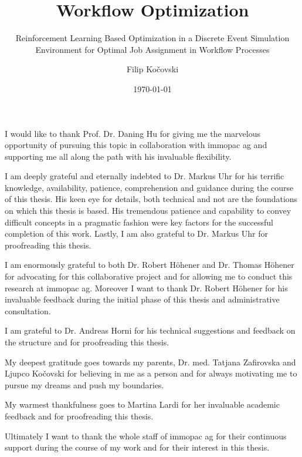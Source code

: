 \documentclass{seal_thesis}
\date{\today}
\title{Workflow Optimization}
\subtitle{Reinforcement Learning Based Optimization in a Discrete Event Simulation Environment for Optimal Job Assignment in Workflow Processes}
\author{Filip Ko\v{c}ovski}
\begin{document}
\maketitle

\frontmatter

\begin{acknowledgements}

I would like to thank Prof. Dr. Daning Hu for giving me the marvelous opportunity of pursuing this topic in collaboration with immopac ag and supporting me all along the path with his invaluable flexibility.

I am deeply grateful and eternally indebted to Dr. Markus Uhr for his terrific knowledge, availability, patience, comprehension and guidance during the course of this thesis. His keen eye for details, both technical and not are the foundations on which this thesis is based. His tremendous patience and capability to convey difficult concepts in a pragmatic fashion were key factors for the successful completion of this work. Lastly, I am also grateful to Dr. Markus Uhr for proofreading this thesis.

I am enormously grateful to both Dr. Robert H\"ohener and Dr. Thomas H\"ohener for advocating for this collaborative project and for allowing me to conduct this research at immopac ag. Moreover I want to thank Dr. Robert H\"ohener for his invaluable feedback during the initial phase of this thesis and administrative consultation.

I am grateful to Dr. Andreas Horni for his technical suggestions and feedback on the \latex structure and for proofreading this thesis.

My deepest gratitude goes towards my parents, Dr. med. Tatjana Zafirovska and Ljupco Ko\v{c}ovski for believing in me as a person and for always motivating me to pursue my dreams and push my boundaries.

My warmest thankfulness goes to Martina Lardi for her invaluable academic feedback and for proofreading this thesis.

Ultimately I want to thank the whole staff of immopac ag for their continuous support during the course of my work and for their interest in this thesis.

\end{acknowledgements}
\end{document}
